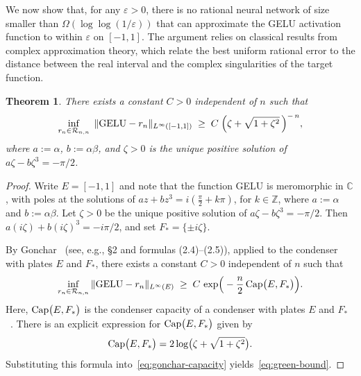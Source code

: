 \documentclass{article}
\theoremstyle{plain}
\newtheorem{theorem}{Theorem}[section]
\theoremstyle{definition}
\theoremstyle{remark}
\begin{document}
We now show that, for any $\varepsilon>0$, there is no rational neural network of size smaller than  $\Omega(\log\log(1/\varepsilon))$ that can approximate the GELU activation function to within $\varepsilon$ on $[-1,1]$. The argument relies on classical results from complex approximation theory, which relate the best uniform rational error to the distance between the real interval and the complex singularities of the target function. 

\begin{theorem} 
There exists a constant $C>0$ independent of $n$ such that
\begin{equation}\label{eq:green-bound}
\inf_{\substack{r_n\in\mathcal{R}_{n,n}}}\;\|{\rm GELU}-r_n\|_{L^\infty([-1,1])} \;\ge\; C\;\Big(\zeta+\sqrt{1+\zeta^2}\,\Big)^{-\,n},
\end{equation}
where $a:=\alpha$, $b:=\alpha\beta$, and $\zeta>0$ is the unique positive solution of $a\zeta-b\zeta^3=-\pi/2$.
\end{theorem}

\begin{proof}
Write $E=[-1,1]$ and note that the function GELU is meromorphic in $\mathbb{C}$, with poles at the solutions of
\(a z+b z^3=i(\tfrac{\pi}{2}+k\pi)\), for \(k\in\mathbb{Z}\), where \(a:=\alpha\) and \(b:=\alpha\beta\). Let $\zeta>0$ be the unique positive solution of \(a\zeta-b\zeta^3=-\pi/2\). Then \(a(i\zeta)+b(i\zeta)^3=-i\pi/2\), and set \(F_\ast=\{\pm i\zeta\}\).

By Gonchar~\cite{gonchar2011rational} (see, e.g., \S2 and formulas (2.4)–(2.5)), applied to the condenser with plates $E$ and $F_\ast$, there exists a constant $C>0$ independent of $n$ such that
\begin{equation}\label{eq:gonchar-capacity}
\inf_{r_n\in\mathcal{R}_{n,n}}\|{\rm GELU}-r_n\|_{L^\infty(E)} \;\ge\; C\,\exp\!\Big(-\frac{n}{2}\,{\rm Cap}\big(E,F_\ast\big)\Big).
\end{equation}
Here, ${\rm Cap}\big(E,F_\ast\big)$ is the condenser capacity of a condenser with plates $E$ and $F_\ast$~\cite{saff1997logarithmic}. There is an explicit expression for ${\rm Cap}\big(E,F_\ast\big)$ given by 
\[
{\rm Cap}\big(E,F_\ast\big) = 2\log\!\big(\zeta+\sqrt{1+\zeta^2}\big).
\]
Substituting this formula into~\cref{eq:gonchar-capacity} yields~\cref{eq:green-bound}. 
\end{proof}
\end{document}
